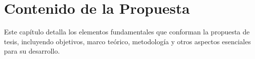 \chapter{Contenido de la Propuesta}

Este capítulo detalla los elementos fundamentales que conforman la propuesta de tesis, incluyendo objetivos, marco teórico, metodología y otros aspectos esenciales para su desarrollo.










